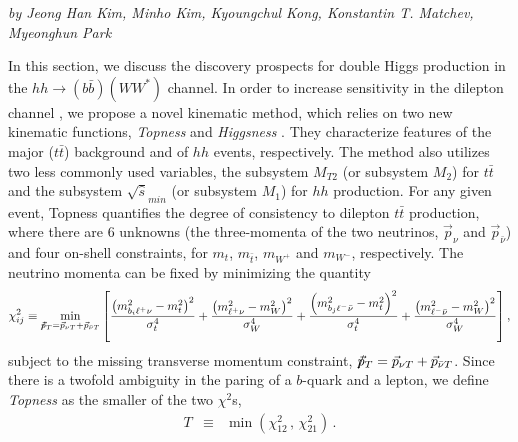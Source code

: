 \begin{center}
\textit{by Jeong Han Kim, Minho Kim, Kyoungchul Kong, Konstantin
  T. Matchev, Myeonghun Park}
\end{center}


In this section, we discuss the discovery prospects for double Higgs production in the $hh \to (b\bar b) (W W^*)$ channel. In order to increase sensitivity in the dilepton channel \cite{CMS:2015nat,CMS:2017cwx,Adhikary:2017jtu}, we propose a novel kinematic method, which relies on two new kinematic functions, {\it Topness} and {\it Higgsness} \cite{Kim:2018cxf}. They characterize features of the major ($t\bar t$) background and of $hh$ events, respectively. The method also utilizes two less commonly used variables, the subsystem $M_{T2}$ (or subsystem $M_2$) \cite{Lester:1999tx,Burns:2008va,Barr:2011xt} for $t\bar t$ and the subsystem $\sqrt{\hat {s}}_{min}$ (or subsystem $M_1$) \cite{Konar:2008ei,Konar:2010ma,Barr:2011xt} for $hh$ production.
%
For any given event, Topness \cite{Graesser:2012qy,Kim:2018cxf} quantifies the degree of consistency to dilepton $t\bar t$ production, where there are 6 unknowns (the three-momenta of the two neutrinos, $\vec p_{\nu}$ and $\vec p_{\bar\nu}$) and four on-shell constraints, for
$m_t$, $m_{\bar t}$, $m_{W^+}$ and $m_{W^-}$, respectively. The neutrino momenta can be fixed by minimizing the quantity 
%
\begin{eqnarray}
\chi^2_{ij} \equiv \min_{\tiny {/\!\!\!\vec{ p}_T} = \vec p_{\nu T} + \vec p_{ \bar\nu T}}  \left [ 
\frac{\left ( m^2_{b_i \ell^+ \nu} - m^2_t \right )^2}{\sigma_t^4}    +
\frac{\left ( m^2_{\ell^+ \nu} - m^2_W \right )^2}{\sigma_W^4}   \label{eq:tt}  
 + \frac{\left ( m^2_{b_j \ell^- \bar \nu} - m^2_t \right )^2}{\sigma_t^4}  +
\frac{\left ( m^2_{\ell^- \bar\nu} - m^2_W \right )^2}{\sigma_W^4}   \right ]  , 
\end{eqnarray}
%
subject to the missing transverse momentum constraint, $ {/\!\!\!\vec{ p}_T} = \vec p_{\nu T} + \vec p_{ \bar\nu T}$. 
Since there is a twofold ambiguity in the paring of a $b$-quark and a lepton, we define {\it Topness} as the smaller of the two $\chi^2$s,
\begin{eqnarray}
T &\equiv&  { \min} \left ( \chi^2_{12} \, , \, \chi^2_{21} \right ) \, .
\end{eqnarray}

